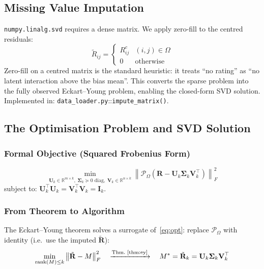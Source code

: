 \documentclass[12pt, a4paper]{article}
\newcommand{\R}{\mathbb{R}}
\newcommand{\Rmat}{\mathbf{R}}
\newcommand{\Umat}{\mathbf{U}}
\newcommand{\Smat}{\boldsymbol{\Sigma}}
\newcommand{\Vmat}{\mathbf{V}}
\newcommand{\norm}[1]{\left\| #1 \right\|}
\newcommand{\FroSq}[1]{\norm{#1}_{F}^{2}}
\newcommand{\Om}{\Omega}
\newcommand{\Proj}{\mathcal{P}_{\Omega}}
\DeclareMathOperator*{\rank}{rank}
\newcommand{\file}[1]{\texttt{\small #1}}
\begin{document}
\subsection{Missing Value Imputation}

\texttt{numpy.linalg.svd} requires a dense matrix.
We apply zero-fill to the centred residuals:
\begin{equation}
  \tilde{R}_{ij} = \begin{cases} R^c_{ij} & (i,j)\in\Om \\ 0 & \text{otherwise} \end{cases}
  \label{eq:impute}
\end{equation}
Zero-fill on a centred matrix is the standard heuristic: it treats
``no rating'' as ``no latent interaction above the bias mean''.
This converts the sparse problem into the fully observed Eckart--Young
problem, enabling the closed-form SVD solution.
Implemented in: \file{data\_loader.py}::\texttt{impute\_matrix()}.

\subsection{The Optimisation Problem and SVD Solution}

\subsubsection{Formal Objective (Squared Frobenius Form)}
\begin{equation}
  \min_{\Umat_k \in \R^{m\times k},\;
        \Smat_k \succeq 0 \text{ diag},\;
        \Vmat_k \in \R^{n\times k}}
  \FroSq{\Proj\!\left(\Rmat - \Umat_k \Smat_k \Vmat_k^\top\right)}
  \label{eq:opt}
\end{equation}
subject to: $\Umat_k^\top\Umat_k = \Vmat_k^\top\Vmat_k = \mathbf{I}_k$.

\subsubsection{From Theorem to Algorithm}

The Eckart--Young theorem solves a surrogate of~\eqref{eq:opt}:
replace $\Proj$ with identity (i.e.\ use the imputed $\tilde{\Rmat}$):
\[
  \min_{\rank(M)\leq k} \FroSq{\tilde{\Rmat} - M}
  \quad\xrightarrow{\text{Thm.~\ref{thm:ey}}}\quad
  M^* = \tilde{\Rmat}_k = \Umat_k\Smat_k\Vmat_k^\top
\]
\end{document}

